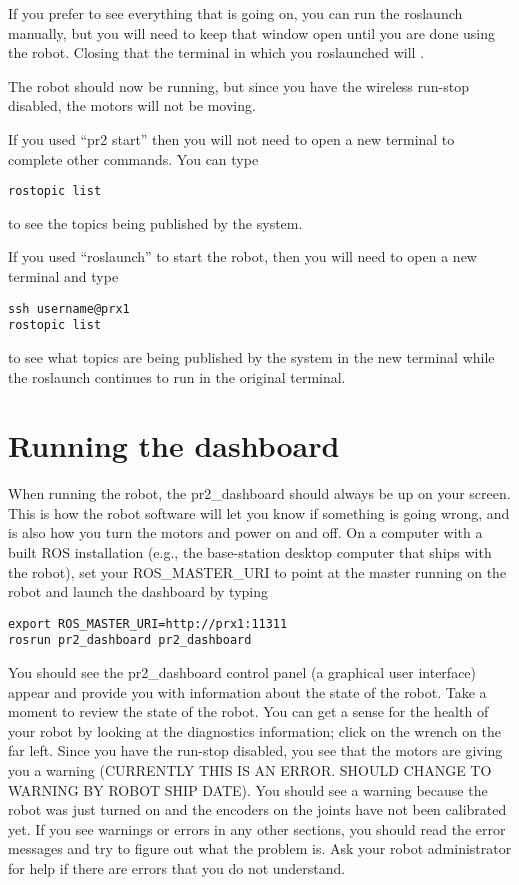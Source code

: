 If you prefer to see everything that is going on, you can run the roslaunch manually, but you will need to keep that window open until you are done using the robot. Closing that the terminal in which you roslaunched will %
.

The robot should now be running, but since you have the wireless run-stop disabled, the motors will not be moving.  

If you used ``pr2 start'' then you will not need to open a new terminal to complete other commands. You can type 
\begin{verbatim}
rostopic list
\end{verbatim}
to see the topics being published by the system. 

If you used ``roslaunch'' to start the robot, then you will need to open a new terminal and type
\begin{verbatim}
ssh username@prx1
rostopic list
\end{verbatim}
to see what topics are being published by the system in the new terminal while the roslaunch continues to run in the original terminal.

\section{Running the dashboard}
When running the robot, the pr2\_dashboard should always be up on your screen.  This is how the robot software will let you know if something is going wrong, and is also how you turn the motors and power on and off.  On a computer with a built ROS installation (e.g., the base-station desktop computer that ships with the robot), set your ROS\_MASTER\_URI to point at the master running on the robot and launch the dashboard by typing
\begin{verbatim}
export ROS_MASTER_URI=http://prx1:11311
rosrun pr2_dashboard pr2_dashboard
\end{verbatim}
You should see the pr2\_dashboard control panel (a graphical user interface) appear and provide you with information about the state of the robot.  Take a moment to review the state of the robot. You can get a sense for the health of your robot by looking at the diagnostics information; click on the wrench on the far left.  Since you have the run-stop disabled, you see that the motors are giving you a warning (CURRENTLY THIS IS AN ERROR.  SHOULD CHANGE TO WARNING BY ROBOT SHIP DATE).  You should see a warning because the robot was just turned on and the encoders on the joints have not been calibrated yet.
If you see warnings or errors in any other sections, you should read the error messages and try to figure out what the problem is.  Ask your robot administrator for help if there are errors that you do not understand.
